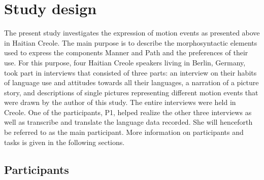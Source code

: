 \documentclass[output=paper,colorlinks,citecolor=brown]{langscibook}
\begin{document}
\section{Study design}\label{sec:3:3}

The present study investigates the expression of motion events as presented above in Haitian Creole. The main purpose is to describe the morphosyntactic elements used to express the components Manner and Path and the preferences of their use. For this purpose, four Haitian Creole speakers living in Berlin, Germany, took part in interviews that consisted of three parts: an interview on their habits of language use and attitudes towards all their languages, a narration of a picture story, and descriptions of single pictures representing different motion events that were drawn by the author of this study. The entire interviews were held in Creole. One of the participants, P1, helped realize the other three interviews as well as transcribe and translate the language data recorded. She will henceforth be referred to as the main participant. More information on participants and tasks is given in the following sections.


\subsection{Participants}
\end{document}
